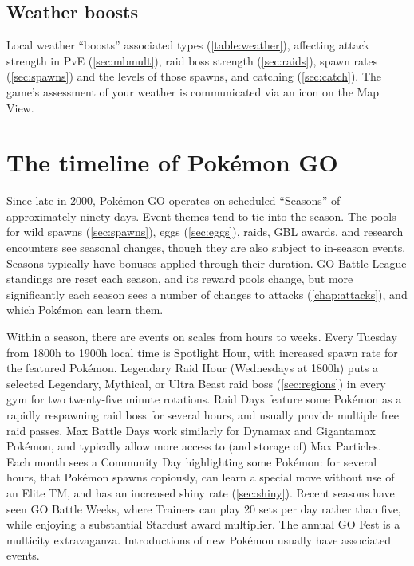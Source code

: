 \subsection{Weather boosts\label{sec:weather}}
Local weather ``boosts'' associated types (\autoref{table:weather}),
  affecting attack strength in PvE (\autoref{sec:mbmult}),
  raid boss strength (\autoref{sec:raids}),
  spawn rates (\autoref{sec:spawns}) and the levels of those spawns,
  and catching (\autoref{sec:catch}).
The game's assessment of your weather is communicated via an icon on the Map View.
\begin{table}

\end{table}
\section{The timeline of Pokémon GO\label{sec:timeline}}
Since late in 2000, Pokémon GO operates on scheduled ``Seasons'' of approximately ninety days.
Event themes tend to tie into the season.
The pools for wild spawns (\autoref{sec:spawns}), eggs (\autoref{sec:eggs}), raids, GBL awards,
 and research encounters see seasonal changes, though they are also subject to in-season events.
Seasons typically have bonuses applied through their duration.
GO Battle League standings are reset each season, and its reward pools change, but
 more significantly each season sees a number of changes to attacks (\autoref{chap:attacks}),
 and which Pokémon can learn them.

Within a season, there are events on scales from hours to weeks.
Every Tuesday from 1800h to 1900h local time is Spotlight Hour, with
 increased spawn rate for the featured Pokémon.
Legendary Raid Hour (Wednesdays at 1800h) puts a selected Legendary, Mythical,
 or Ultra Beast raid boss (\autoref{sec:regions}) in every gym for two
 twenty-five minute rotations.
Raid Days feature some Pokémon as a rapidly respawning raid boss for several hours,
 and usually provide multiple free raid passes.
Max Battle Days work similarly for Dynamax and Gigantamax Pokémon, and typically
 allow more access to (and storage of) Max Particles.
Each month sees a Community Day highlighting some Pokémon: for several hours,
 that Pokémon spawns copiously, can learn a special move without use of an
 Elite TM, and has an increased shiny rate (\autoref{sec:shiny}).
Recent seasons have seen GO Battle Weeks, where Trainers can play 20 sets
 per day rather than five, while enjoying a substantial Stardust award multiplier.
The annual GO Fest is a multicity extravaganza.
Introductions of new Pokémon usually have associated events.

